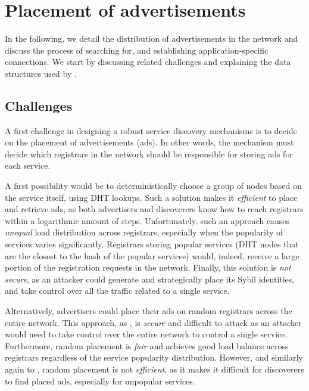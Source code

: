 
\section{Placement of advertisements}
\label{sec:placement}

In the following, we detail the distribution of advertisements in the network and discuss the process of searching for, and establishing application-specific connections.
We start by discussing related challenges and explaining the data structures used by \sysname. 

\subsection{Challenges}


A first challenge in designing a robust service discovery mechanisms is to decide on the placement of advertisements (ads).
In other words, the mechanism must decide which registrars in the network should be responsible for storing ads for each service.

A first possibility would be to deterministically choose a group of nodes based on the service itself, using DHT lookups.
Such a solution makes it \emph{efficient} to place and retrieve ads, as both advertisers and discoverers know how to reach registrars within a logarithmic amount of steps.
Unfortunately, such an approach causes \emph{unequal} load distribution across registrars, especially when the popularity of services varies significantly.
Registrars storing popular services (\ie DHT nodes that are the closest to the hash of the popular services) would, indeed, receive a large portion of the registration requests in the network. 
Finally, this solution is \emph{not secure}, as an attacker could generate and strategically place its Sybil identities, and take control over all the traffic related to a single service. 

Alternatively, advertisers could place their ads on random registrars across the entire network. 
This approach, as \discv, is \emph{secure} and difficult to attack as an attacker would need to take control over the entire network to control a single service.
Furthermore, random placement is \emph{fair} and achieves good load balance across registrars regardless of the service popularity distribution.
However, and similarly again to \discv, random placement is not \emph{efficient}, as it makes it difficult for discoverers to find placed ads, especially for unpopular services. 

